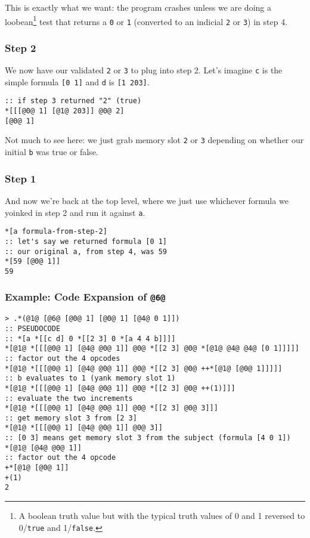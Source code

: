 \documentclass[twoside]{article}
\begin{document}
This is exactly what we want: the program crashes unless we are doing a loobean\footnote{A boolean truth value but with the typical truth values of 0 and 1 reversed to 0/\texttt{true} and 1/\texttt{false}.} test that returns a \lstinline[style=inlinecode]{0} or \lstinline[style=inlinecode]{1} (converted to an indicial \lstinline[style=inlinecode]{2} or \lstinline[style=inlinecode]{3}) in step 4.

\subsubsection{Step 2}

We now have our validated \lstinline[style=inlinecode]{2} or \lstinline[style=inlinecode]{3} to plug into step 2. Let's imagine \lstinline[style=inlinecode]{c} is the simple formula \lstinline[style=inlinecode]{[0 1]} and \lstinline[style=inlinecode]{d} is \lstinline[style=inlinecode]{[1 203]}.

\begin{lstlisting}[style=listingblock]
:: if step 3 returned "2" (true)
*[[[@0@ 1] [@1@ 203]] @0@ 2]
[@0@ 1]
\end{lstlisting}

Not much to see here: we just grab memory slot \lstinline[style=inlinecode]{2} or \lstinline[style=inlinecode]{3} depending on whether our initial \lstinline[style=inlinecode]{b} was true or false.

\subsubsection{Step 1}

And now we're back at the top level, where we just use whichever formula we yoinked in step 2 and run it against \lstinline[style=inlinecode]{a}.

\begin{lstlisting}[style=listingblock]
*[a formula-from-step-2]
:: let's say we returned formula [0 1]
:: our original a, from step 4, was 59
*[59 [@0@ 1]]
59
\end{lstlisting}

\subsubsection{Example: Code Expansion of \lstinline[style=inlinecode]{@6@}}

\begin{lstlisting}[style=listingcode]
> .*(@1@ [@6@ [@0@ 1] [@0@ 1] [@4@ 0 1]])
:: PSEUDOCODE
:: *[a *[[c d] 0 *[[2 3] 0 *[a 4 4 b]]]]
*[@1@ *[[[@0@ 1] [@4@ @0@ 1]] @0@ *[[2 3] @0@ *[@1@ @4@ @4@ [0 1]]]]]
:: factor out the 4 opcodes
*[@1@ *[[[@0@ 1] [@4@ @0@ 1]] @0@ *[[2 3] @0@ ++*[@1@ [@0@ 1]]]]]
:: b evaluates to 1 (yank memory slot 1)
*[@1@ *[[[@0@ 1] [@4@ @0@ 1]] @0@ *[[2 3] @0@ ++(1)]]]
:: evaluate the two increments
*[@1@ *[[[@0@ 1] [@4@ @0@ 1]] @0@ *[[2 3] @0@ 3]]]
:: get memory slot 3 from [2 3]
*[@1@ *[[[@0@ 1] [@4@ @0@ 1]] @0@ 3]]
:: [0 3] means get memory slot 3 from the subject (formula [4 0 1])
*[@1@ [@4@ @0@ 1]]
:: factor out the 4 opcode
+*[@1@ [@0@ 1]]
+(1)
2
\end{lstlisting}
\end{document}
